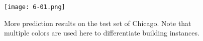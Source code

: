 \begin{figure}[!h]
	\centering
	\texttt{[image: 6-01.png]}
    \caption[More prediction results on the test set of Chicago]{More prediction results on the test set of Chicago. Note that multiple colors are used here to differentiate building instances.}
	\label{fig:finalchmore}
\end{figure}